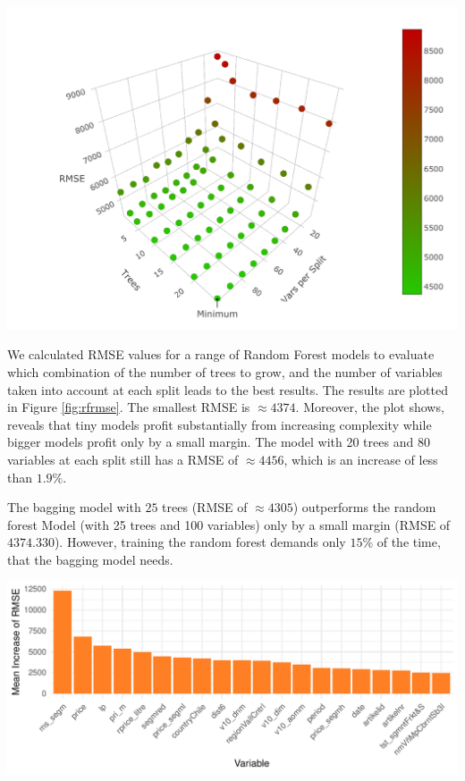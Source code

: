 \documentclass[11pt,]{article}
\let\origfigure\figure
\let\endorigfigure\endfigure
\renewenvironment{figure}[1][2] {
    \expandafter\origfigure\expandafter[H]
} {
    \endorigfigure
}
\begin{document}
\begin{figure}

{\centering \includegraphics{../00_data/output_paper/10_rf_plot} 

}

\caption[RMSE's of the Random Forest for Different Parameters]{\label{fig:rfrmse}Random Forest: Dependency between RMSE, the Number of Trees and the Number of Variables Included at each Split.}\label{fig:unnamed-chunk-10}
\end{figure}

We calculated \ac{RMSE} values for a range of Random Forest models to
evaluate which combination of the number of trees to grow, and the
number of variables taken into account at each split leads to the best
results. The results are plotted in Figure \ref{fig:rfrmse}. The
smallest \ac{RMSE} is \(\approx 4374\). Moreover, the plot shows,
reveals that tiny models profit substantially from increasing complexity
while bigger models profit only by a small margin. The model with 20
trees and 80 variables at each split still has a \ac{RMSE} of
\(\approx 4456\), which is an increase of less than \(1.9\%\).

The \ac{bagging} model with \(25\) trees (\ac{RMSE} of \(\approx 4305\))
outperforms the random forest Model (with 25 trees and 100 variables)
only by a small margin (\ac{RMSE} of \(4374.330\)). However, training
the random forest demands only \(15\%\) of the time, that the
\ac{bagging} model needs.

\begin{figure}
\centering
\includegraphics{../00_data/output_paper/11_var_imp_random_forest_bp.pdf}
\caption{\label{fig:rfimp}Random Forest: Variable Importance.}
\end{figure}
\end{document}
